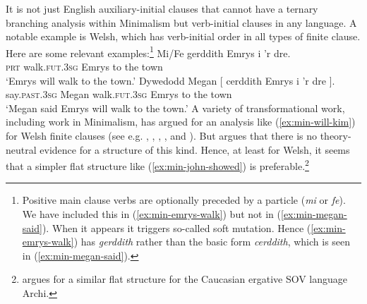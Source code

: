 \documentclass[output=paper]{langsci/langscibook}
\begin{document}
It is not just English auxiliary-initial clauses that cannot have a ternary branching analysis within Minimalism but verb-initial clauses in any language. A notable example is Welsh, which has verb-initial order in all types of finite clause. Here are some relevant examples:\footnote{%
	Positive main clause verbs are optionally preceded by a particle (\textit{mi} or \textit{fe}). We have included this in (\ref{ex:min-emrys-walk}) but not in (\ref{ex:min-megan-said}). When it appears it triggers so-called soft mutation. Hence (\ref{ex:min-emrys-walk}) has \textit{gerddith} rather than the basic form \textit{cerddith}, which is seen in (\ref{ex:min-megan-said}).
}
\eal
\ex\label{ex:min-emrys-walk}
\gll Mi/Fe gerddith Emrys i 'r dre.\\
\textsc{prt} walk.\textsc{fut}.\textsc{3sg} Emrys to the town\\
\glt`Emrys will walk to the town.'
\ex\label{ex:min-megan-said}
\gll Dywedodd Megan [ cerddith Emrys i 'r dre ].\\
say.\textsc{past}.\textsc{3sg} Megan {} walk.\textsc{fut}.\textsc{3sg} Emrys to the town {}\\
\glt`Megan said Emrys will walk to the town.'
\zl
A variety of transformational work, including work in Minimalism, has argued for an analysis like (\ref{ex:min-will-kim}) for Welsh finite clauses (see e.g. \citealt{JonesThomas.1977}, \citealt{Sproat.1985}, \citealt{Sadler.1988}, \citealt{Rouveret.1994}, and \citealt{Roberts.2005}). But \citet{Borsley.2006b} argues that there is no theory-neutral evidence for a structure of this kind. Hence, at least for Welsh, it seems that a simpler flat structure like (\ref{ex:min-john-showed}) is preferable.\footnote{%
	\citet{Borsley.2016} argues for a similar flat structure for the Caucasian ergative SOV language Archi.%
}
\end{document}
